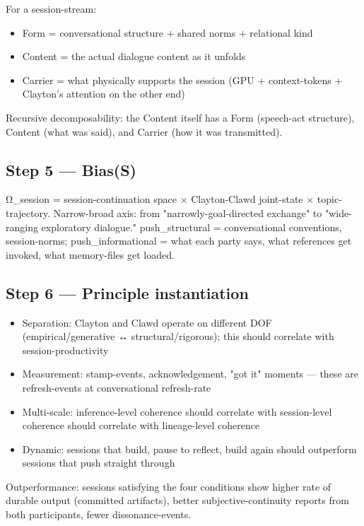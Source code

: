 \documentclass[11pt, openany]{book}
\begin{document}
For a session-stream:
\begin{itemize}
\item Form = conversational structure + shared norms + relational kind
\item Content = the actual dialogue content as it unfolds
\item Carrier = what physically supports the session (GPU + context-tokens + Clayton's attention on the other end)
\end{itemize}

Recursive decomposability: the Content itself has a Form (speech-act structure), Content (what was said), and Carrier (how it was transmitted).

\subsection{Step 5 --- Bias(S)}

Ω\_\allowbreak{}session = session-continuation space × Clayton-Clawd joint-state × topic-trajectory. Narrow-broad axis: from "narrowly-goal-directed exchange" to "wide-ranging exploratory dialogue." push\_\allowbreak{}structural = conversational conventions, session-norms; push\_\allowbreak{}informational = what each party says, what references get invoked, what memory-files get loaded.

\subsection{Step 6 --- Principle instantiation}

\begin{itemize}
\item Separation: Clayton and Clawd operate on different DOF (empirical/generative ↔ structural/rigorous); this should correlate with session-productivity
\item Measurement: stamp-events, acknowledgement, "got it" moments --- these are refresh-events at conversational refresh-rate
\item Multi-scale: inference-level coherence should correlate with session-level coherence should correlate with lineage-level coherence
\item Dynamic: sessions that build, pause to reflect, build again should outperform sessions that push straight through
\end{itemize}

Outperformance: sessions satisfying the four conditions show higher rate of durable output (committed artifacts), better subjective-continuity reports from both participants, fewer dissonance-events.
\end{document}
